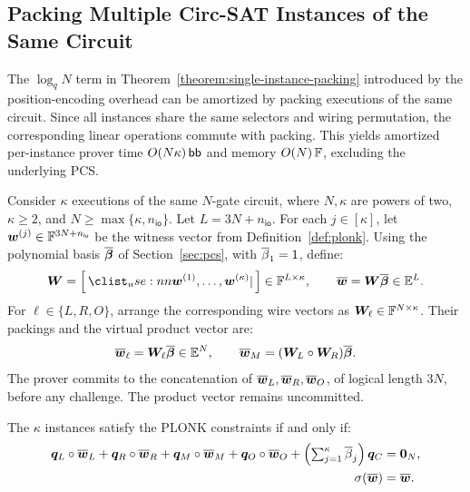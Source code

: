 \iffalse
\subsection{Packing Multiple Circ-SAT Instances of the Same Circuit}
\label{sec:multi-instance-packing}

The $\log_q N$ term in
Theorem~\ref{theorem:single-instance-packing} introduced by the
position-encoding overhead can be amortized by packing executions of the same circuit.
Since all instances share the same selectors and wiring
permutation, the corresponding linear operations commute
with packing.
This yields amortized per-instance prover time
\(O(N\kappa)\,\mathsf{bb}\) and memory \(O(N)\,{\mathbb{F}}\), excluding
the underlying PCS.

Consider \(\kappa\) executions of the same \(N\)-gate circuit,
where \(N,\kappa\) are powers of two,
\(\kappa\geq2\), and \(N\geq\max\{\kappa,n_{\mathsf{io}}\}\).
Let \(L=3N+n_{\mathsf{io}}\).
For each \(j\in[\kappa]\), let
\(\bm w^{(j)}\in{\mathbb{F}}^{3N+n_{\mathsf{io}}}\)
be the witness vector from Definition~\ref{def:plonk}.
Using the polynomial basis \(\overline{\bm\beta}\) of
Section~\ref{sec:pcs}, with \(\overline{\beta}_1=1\), define:
\[
    \bm W
       =\concat{\bm w^{(1)},\ldots,\bm w^{(\kappa)}}
       \in\Field^{L\times\kappa},
    \qquad
    \ext{\bm w}=\bm W\ext{\bm\beta}\in\ExtensionField^L.
\]
For \(\ell\in\{L,R,O\}\), arrange the corresponding wire
vectors as \(\bm W_\ell\in{\mathbb{F}}^{N\times\kappa}\).
Their packings and the virtual product vector are:
\begin{equation}
    \overline{\bm w}_\ell=\bm W_\ell\overline{\bm\beta}
       \in\mathbb{E}^N,
    \qquad
    \overline{\bm w}_M=(\bm W_L\circ\bm W_R)\overline{\bm\beta}.
\label{eq:together-multiple-wires}
\end{equation}
The prover commits to the concatenation of
\(\overline{\bm w}_L,\overline{\bm w}_R,\overline{\bm w}_O\), of logical
length \(3N\), before any challenge.
The product vector remains uncommitted.

\begin{lemma}
\label{lemma:packedPlonk}
The \(\kappa\) instances satisfy the PLONK constraints if and only if:
\begin{align}
    \bm q_L\circ\overline{\bm w}_L
    +\bm q_R\circ\overline{\bm w}_R
    +\bm q_M\circ\overline{\bm w}_M
    +\bm q_O\circ\overline{\bm w}_O
    +\textstyle \left(\sum_{j=1}^{\kappa}\overline{\beta}_j\right)\bm q_C
       &=\bm0_N,
       \label{eq:together-multiple-gates}\\
    \sigma(\overline{\bm w})&=\overline{\bm w}.
       \label{eq:packed-plonk2}
\end{align}
\end{lemma}

